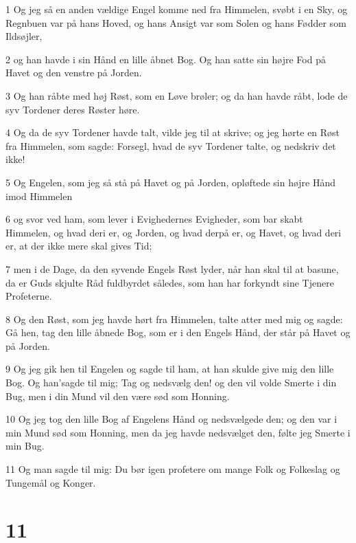 \par 1 Og jeg så en anden vældige Engel komme ned fra Himmelen, svøbt i en Sky, og Regnbuen var på hans Hoved, og hans Ansigt var som Solen og hans Fødder som Ildsøjler,
\par 2 og han havde i sin Hånd en lille åbnet Bog. Og han satte sin højre Fod på Havet og den venstre på Jorden.
\par 3 Og han råbte med høj Røst, som en Løve brøler; og da han havde råbt, lode de syv Tordener deres Røster høre.
\par 4 Og da de syv Tordener havde talt, vilde jeg til at skrive; og jeg hørte en Røst fra Himmelen, som sagde: Forsegl, hvad de syv Tordener talte, og nedskriv det ikke!
\par 5 Og Engelen, som jeg så stå på Havet og på Jorden, opløftede sin højre Hånd imod Himmelen
\par 6 og svor ved ham, som lever i Evighedernes Evigheder, som bar skabt Himmelen, og hvad deri er, og Jorden, og hvad derpå er, og Havet, og hvad deri er, at der ikke mere skal gives Tid;
\par 7 men i de Dage, da den syvende Engels Røst lyder, når han skal til at basune, da er Guds skjulte Råd fuldbyrdet således, som han har forkyndt sine Tjenere Profeterne.
\par 8 Og den Røst, som jeg havde hørt fra Himmelen, talte atter med mig og sagde: Gå hen, tag den lille åbnede Bog, som er i den Engels Hånd, der står på Havet og på Jorden.
\par 9 Og jeg gik hen til Engelen og sagde til ham, at han skulde give mig den lille Bog. Og han'sagde til mig; Tag og nedsvælg den! og den vil volde Smerte i din Bug, men i din Mund vil den være sød som Honning.
\par 10 Og jeg tog den lille Bog af Engelens Hånd og nedsvælgede den; og den var i min Mund sød som Honning, men da jeg havde nedsvælget den, følte jeg Smerte i min Bug.
\par 11 Og man sagde til mig: Du bør igen profetere om mange Folk og Folkeslag og Tungemål og Konger.

\chapter{11}

